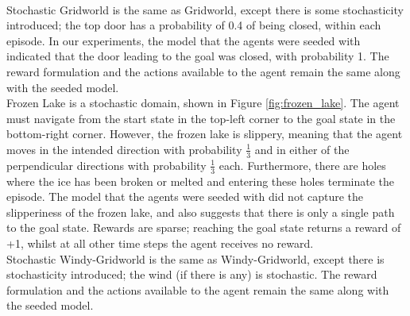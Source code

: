 \\Stochastic Gridworld is the same as Gridworld, except there is some stochasticity introduced; the top door has a probability of 0.4 of being closed, within each episode. In our experiments, the model that the agents were seeded with indicated that the door leading to the goal was closed, with probability 1. The reward formulation and the actions available to the agent remain the same along with the seeded model.
\\Frozen Lake \cite{1606.01540} is a stochastic domain, shown in Figure \ref{fig:frozen_lake}. The agent must navigate from the start state in the top-left corner to the goal state in the bottom-right corner. However, the frozen lake is slippery, meaning that the agent moves in the intended direction with probability $\frac{1}{3}$ and in either of the perpendicular directions with probability $\frac{1}{3}$ each. Furthermore, there are holes where the ice has been broken or melted and entering these holes terminate the episode. The model that the agents were seeded with did not capture the slipperiness of the frozen lake, and also suggests that there is only a single path to the goal state. Rewards are sparse; reaching the goal state returns a reward of +1, whilst at all other time steps the agent receives no reward.
\\Stochastic Windy-Gridworld is the same as Windy-Gridworld, except there is stochasticity introduced;  the wind (if there is any) is stochastic. The reward formulation and the actions available to the agent remain the same along with the seeded model.

